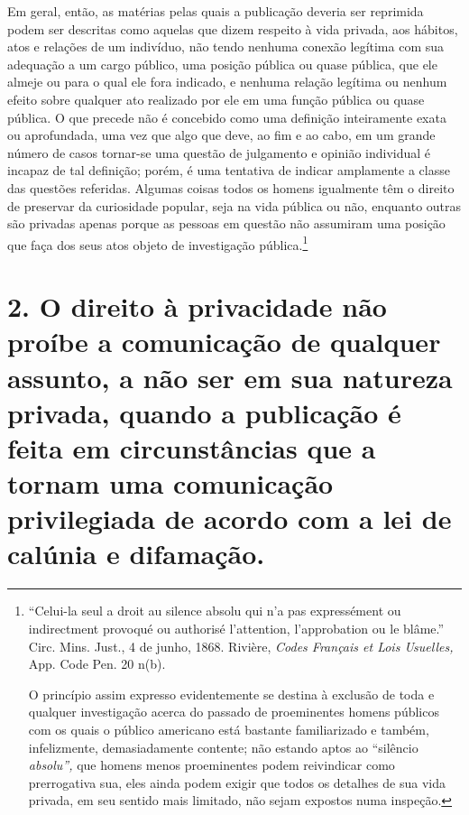 Em geral, então, as matérias pelas quais a publicação deveria ser
reprimida podem ser descritas como aquelas que dizem respeito à vida
privada, aos hábitos, atos e relações de um indivíduo, não tendo nenhuma
conexão legítima com sua adequação a um cargo público, uma posição
pública ou quase pública, que ele almeje ou para o qual ele fora
indicado, e nenhuma relação legítima ou nenhum efeito sobre qualquer ato
realizado por ele em uma função pública ou quase pública. O que precede
não é concebido como uma definição inteiramente exata ou aprofundada,
uma vez que algo que deve, ao fim e ao cabo, em um grande número de
casos tornar-se uma questão de julgamento e opinião individual é incapaz
de tal definição; porém, é uma tentativa de indicar amplamente a classe
das questões referidas. Algumas coisas todos os homens igualmente têm o
direito de preservar da curiosidade popular, seja na vida pública ou
não, enquanto outras são privadas apenas porque as pessoas em questão
não assumiram uma posição que faça dos seus atos objeto de investigação
pública.\footnote{``Celui-la seul a droit au silence absolu qui n'a pas
  expressément ou indirectment provoqué ou authorisé l'attention,
  l'approbation ou le blâme.'' Circ. Mins. Just., 4 de junho, 1868.
  Rivière, \emph{Codes Français et Lois Usuelles,} App. Code Pen. 20
  n(b).

  O princípio assim expresso evidentemente se destina à exclusão de toda
  e qualquer investigação acerca do passado de proeminentes homens
  públicos com os quais o público americano está bastante familiarizado
  e também, infelizmente, demasiadamente contente; não estando aptos ao
  ``silêncio \emph{absolu'',} que homens menos proeminentes podem
  reivindicar como prerrogativa sua, eles ainda podem exigir que todos
  os detalhes de sua vida privada, em seu sentido mais limitado, não
  sejam expostos numa inspeção.}

\section{2. O direito à privacidade não proíbe a comunicação de qualquer
assunto, a não ser em sua natureza privada, quando a publicação é feita
em circunstâncias que a tornam uma comunicação privilegiada de acordo
com a lei de calúnia e difamação.}

